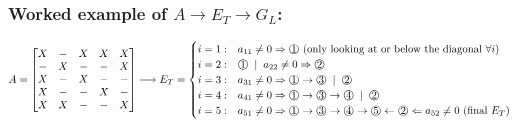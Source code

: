 \documentclass{article}
\newcommand*\circled[1]{\raisebox{.5pt}{\textcircled{\raisebox{-.9pt} {#1}}}}
\begin{document}
\subsubsection{Worked example of $A \longrightarrow E_T \longrightarrow G_L$:}
\begin{align*}
    A = \begin{bmatrix}
        X &- &X &X &X\\
        - &X &- &- &X\\
        X &- &X &- &-\\
        X &- & -& X &-\\
        X &X &- &- &X
    \end{bmatrix}
    \longrightarrow E_T = \begin{cases}
        i=1: & a_{11}\neq 0 \Rightarrow \circled{1} \textrm{ (only looking at or below the diagonal } \forall i)\\
        i=2: & \circled{1}\; \mid \; a_{22}\neq 0 \Rightarrow \circled{2}\\
        i=3: & a_{31}\neq 0 \Rightarrow \circled{1} \rightarrow \circled{3} \; \mid \; \circled{2}\\
        i=4: & a_{41} \neq 0 \Rightarrow \circled{1} \rightarrow \circled{3} \rightarrow \circled{4} \; \mid \; \circled{2}\\
        i=5: & a_{51} \neq 0 \Rightarrow \circled{1} \rightarrow \circled{3} \rightarrow \circled{4} \rightarrow \circled{5} \leftarrow \circled{2} \Leftarrow a_{52}\neq 0 \textrm{ (final $E_T$)}
    \end{cases}
\end{align*}
\end{document}
